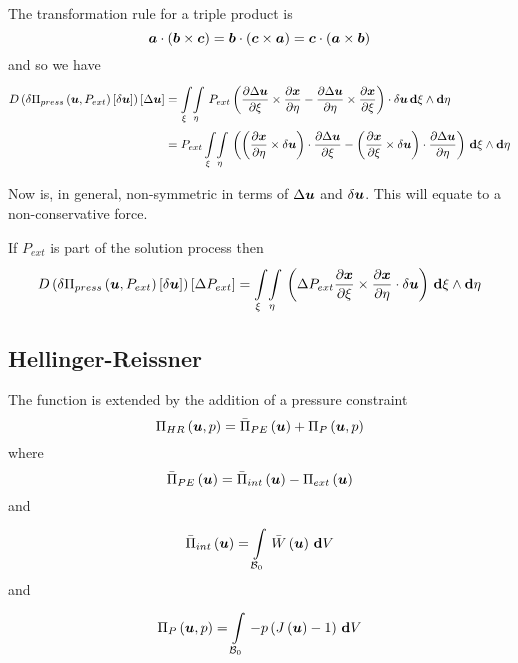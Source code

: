 The transformation rule for a triple product is
\begin{equation}
   \boldsymbol{a}  \cdot  \left(  \boldsymbol{b} \times \boldsymbol{c}  \right) =
   \boldsymbol{b}  \cdot  \left(  \boldsymbol{c} \times \boldsymbol{a}  \right) =
   \boldsymbol{c}  \cdot  \left(  \boldsymbol{a} \times \boldsymbol{b}  \right) 
\end{equation}
and so we have
\begin{equation}
  \begin{split}
  \directionalderiv{}{\variation{\fnof{\Pi_{press}}{\vectr{u},P_{ext}}}{\vectr{u}}}{\linearisationdir{\vectr{u}}}
   &=\giint{\xi}{}{\eta}{}{\dotprod{P_{ext}\pbrac{\crossprod{\delby{\Delta\vectr{u}}{\xi}}{\delby{\vectr{x}}{\eta}}-
            \crossprod{\delby{\Delta\vectr{u}}{\eta}}{\delby{\vectr{x}}{\xi}}}}{\delta\vectr{u}}}{\xi}{\eta}\\
    &=P_{ext}\giint{\xi}{}{\eta}{}{\pbrac{
        \dotprod{\pbrac{\crossprod{\delby{\vectr{x}}{\eta}}{\variationdir{\vectr{u}}}}}{\delby{\linearisationdir{\vectr{u}}}{\xi}}-
        \dotprod{\pbrac{\crossprod{\delby{\vectr{x}}{\xi}}{\variationdir{\vectr{u}}}}}{\delby{\linearisationdir{\vectr{u}}}{\eta}}}}{\xi}{\eta}
  \end{split}
  \label{eqn:nonsympressuredirectderiv}
\end{equation}

Now  is, in general, non-symmetric in terms of
$  \Delta  \boldsymbol{u} $ and $  \delta  \boldsymbol{u} $. This will equate to a
non-conservative force.

If $P_{ext}$ is part of the solution process then
\begin{equation}
  \directionalderiv{}{\variation{\fnof{\Pi_{press}}{\vectr{u},P_{ext}}}{\vectr{u}}}{\linearisationdir{P_{ext}}}=
  \giint{\xi}{}{\eta}{}{\pbrac{\dotprod{\linearisationdir{P_{ext}}\crossprod{\delby{\vectr{x}}{\xi}}{\delby{\vectr{x}}{\eta}}}{\variationdir{\vectr{u}}}}}{\xi}{\eta}
\end{equation}

\subsection{Hellinger-Reissner}

The function is extended by the addition of a pressure constraint
\begin{equation}
   \Pi_{HR}\left( \boldsymbol{u},p \right) = \bar{\Pi}_{PE}\left( \boldsymbol{u} \right) + \Pi_{P}\left( \boldsymbol{u},p \right) 
\end{equation}
where
\begin{equation}
   \bar{\Pi}_{PE}\left( \boldsymbol{u} \right) = \bar{\Pi}_{int}\left( \boldsymbol{u} \right) - \Pi_{ext}\left( \boldsymbol{u} \right) 
\end{equation}
and
\begin{equation}
   \bar{\Pi}_{int}\left( \boldsymbol{u} \right) =  \displaystyle\int\limits_{ \mathcal{B} _{0}}^{} \, \bar{W}\left( \boldsymbol{u} \right) \, \boldsymbol{\mathrm{d}}  V 
\end{equation}
and
\begin{equation}
   \Pi_{P}\left( \boldsymbol{u},p \right) =  \displaystyle\int\limits_{ \mathcal{B} _{0}}^{} \,-p\left(  J\left( \boldsymbol{u} \right) -1 \right)\, \boldsymbol{\mathrm{d}}  V 
\end{equation}

